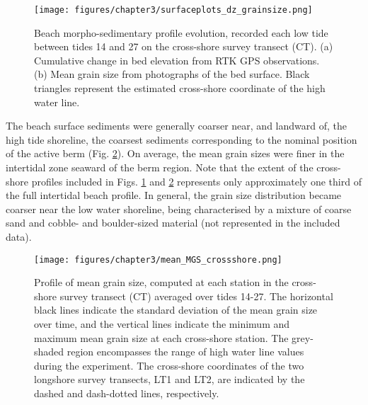 \documentclass[preprint,12pt,authoryear]{elsarticle}
\begin{document}
\begin{figure}[tbp] %
	\texttt{[image: figures/chapter3/surfaceplots\_dz\_grainsize.png]}
	\caption[Surface plots of bed level change and mean grain size by tide]{Beach morpho-sedimentary profile evolution, recorded each low tide between tides 14 and 27 on the cross-shore survey transect (CT). (a) Cumulative change in bed elevation from RTK GPS observations. (b) Mean grain size from photographs of the bed surface. Black triangles represent the estimated cross-shore coordinate of the high water line.}
	\label{fig:alltides_profiles}
\end{figure}

The beach surface sediments were generally coarser near, and landward of, the high tide shoreline, the coarsest sediments corresponding to the nominal position of the active berm (Fig. \ref{fig:mean_MGS_profile}). On average, the mean grain sizes were finer in the intertidal zone seaward of the berm region. Note that the extent of the cross-shore profiles included in Figs. \ref{fig:alltides_profiles} and \ref{fig:mean_MGS_profile} represents only approximately one third of the full intertidal beach profile. In general, the grain size distribution became coarser near the low water shoreline, being characterised by a mixture of coarse sand and cobble- and boulder-sized material (not represented in the included data). 

\begin{figure}[tbp] %
	\begin{center}
		\texttt{[image: figures/chapter3/mean\_MGS\_crossshore.png]}
		\caption[Cross-shore profile of mean grain size]{Profile of mean grain size, computed at each station in the cross-shore survey transect (CT) averaged over tides 14-27. The horizontal black lines indicate the standard deviation of the mean grain size over time, and the vertical lines indicate the minimum and maximum mean grain size at each cross-shore station. The grey-shaded region encompasses the range of high water line values during the experiment. The cross-shore coordinates of the two longshore survey transects, LT1 and LT2, are indicated by the dashed and dash-dotted lines, respectively. \label{fig:mean_MGS_profile}}
	\end{center}
\end{figure}
\end{document}
